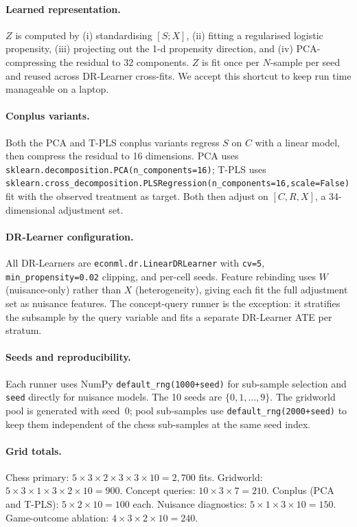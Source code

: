 \documentclass{article}
\begin{document}
\paragraph{Learned representation.} $Z$ is computed by
(i) standardising $[S;X]$, (ii) fitting a regularised logistic propensity,
(iii) projecting out the 1-d propensity direction, and (iv) PCA-compressing
the residual to 32 components. $Z$ is fit once per $N$-sample per seed and
reused across DR-Learner cross-fits. We accept this shortcut to keep run time
manageable on a laptop.

\paragraph{Conplus variants.} Both the PCA and T-PLS conplus variants regress
$S$ on $C$ with a linear model, then compress the residual to 16 dimensions.
PCA uses \texttt{sklearn.decomposition.PCA(n\_components=16)}; T-PLS uses
\texttt{sklearn.cross\_decomposition.PLSRegression(n\_components=16,scale=False)}
fit with the observed treatment as target. Both then adjust on $[C,R,X]$, a
34-dimensional adjustment set.

\paragraph{DR-Learner configuration.} All DR-Learners are
\texttt{econml.dr.LinearDRLearner} with \texttt{cv=5}, \texttt{min\_propensity=0.02}
clipping, and per-cell seeds. Feature rebinding uses $W$ (nuisance-only)
rather than $X$ (heterogeneity), giving each fit the full adjustment set as
nuisance features. The concept-query runner is the exception: it stratifies
the subsample by the query variable and fits a separate DR-Learner ATE per
stratum.

\paragraph{Seeds and reproducibility.} Each runner uses NumPy
\texttt{default\_rng(1000+seed)} for sub-sample selection and \texttt{seed}
directly for nuisance models. The 10 seeds are $\{0,1,\ldots,9\}$. The
gridworld pool is generated with seed~0; pool sub-samples use
\texttt{default\_rng(2000+seed)} to keep them independent of the chess
sub-samples at the same seed index.

\paragraph{Grid totals.} Chess primary: $5\times 3\times 2\times 3\times 3\times 10=2{,}700$ fits.
Gridworld: $5\times 3\times 1\times 3\times 2\times 10=900$. Concept queries:
$10\times 3\times 7=210$. Conplus (PCA and T-PLS): $5\times 2\times 10=100$ each.
Nuisance diagnostics: $5\times 1\times 3\times 10=150$. Game-outcome ablation:
$4\times 3\times 2\times 10=240$.
\end{document}
